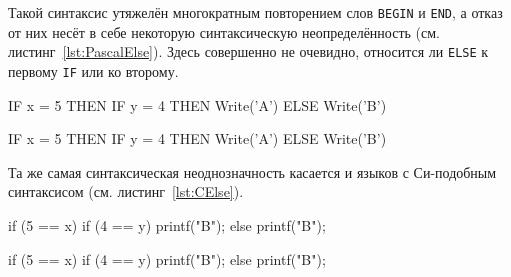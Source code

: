 \documentclass[utf8]{lgu}
\newcommand{\code}[1]{{\normalsize\texttt{#1}}}
\begin{document}
\noindent Такой синтаксис утяжелён многократным повторением слов \code{BEGIN} и \code{END}, а отказ от них несёт в себе некоторую синтаксическую неопределённость (см. листинг~\ref{lst:PascalElse}). Здесь совершенно не очевидно, относится ли \code{ELSE} к первому \code{IF} или ко второму.

\begin{listing}[H]
\caption{Проблема IF THEN ELSE в языке Паскаль}
\label{lst:PascalElse}
\end{listing}

\begin{center}
\vspace{-45pt}
\begin{minipage}[t]{0.45\textwidth}

\begin{listing}[H]
\begin{pascal}
IF x = 5 THEN
  IF y = 4 THEN
    Write('A')
ELSE
  Write('B')
\end{pascal}
\end{listing}

\end{minipage}
\hfill
\begin{minipage}[t]{0.45\textwidth}

\begin{listing}[H]
\begin{pascal}
IF x = 5 THEN
  IF y = 4 THEN
    Write('A')
  ELSE
    Write('B')
\end{pascal}
\end{listing}

\end{minipage}
\end{center}

Та же самая синтаксическая неоднозначность касается и языков с Си-подобным синтаксисом (см. листинг~\ref{lst:CElse}).

\begin{listing}[H]
\caption{Проблема if then else в языке Си}
\label{lst:CElse}
\end{listing}

\begin{center}
\vspace{-45pt}
\begin{minipage}[t]{0.45\textwidth}

\begin{listing}[H]
\begin{cc}
if (5 == x)
  if (4 == y)
    printf("B\n");
else
  printf("B\n");
\end{cc}
\end{listing}

\end{minipage}
\hfill
\begin{minipage}[t]{0.45\textwidth}

\begin{listing}[H]
\begin{cc}
if (5 == x)
  if (4 == y)
    printf("B\n");
  else
    printf("B\n");
\end{cc}
\end{listing}

\end{minipage}
\end{center}
\end{document}
